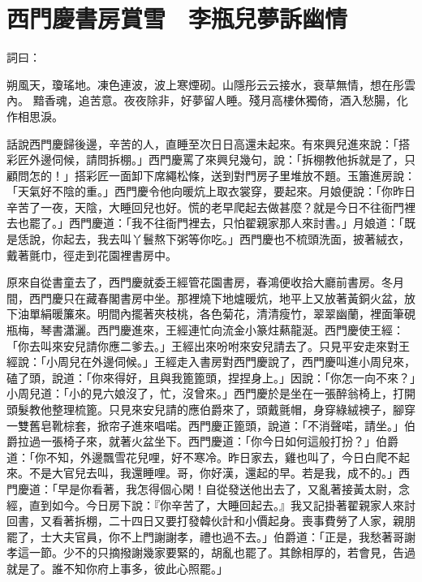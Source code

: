 %

\chapter{西門慶書房賞雪　李瓶兒夢訴幽情}

詞曰：

朔風天，瓊瑤地。凍色連波，波上寒煙砌。山隱彤云云接水，衰草無情，想在彤雲內。
黯香魂，追苦意。夜夜除非，好夢留人睡。殘月高樓休獨倚，酒入愁腸，化作相思淚。

話說西門慶歸後邊，辛苦的人，直睡至次日日高還未起來。有來興兒進來說：「搭彩匠外邊伺候，請問拆棚。」西門慶罵了來興兒幾句，說：「拆棚教他拆就是了，只顧問怎的！」搭彩匠一面卸下席繩松條，送到對門房子里堆放不題。玉簫進房說：「天氣好不陰的重。」西門慶令他向暖炕上取衣裳穿，要起來。月娘便說：「你昨日辛苦了一夜，天陰，大睡回兒也好。慌的老早爬起去做甚麼？就是今日不往衙門裡去也罷了。」西門慶道：「我不往衙門裡去，只怕翟親家那人來討書。」月娘道：「既是恁說，你起去，我去叫丫鬟熬下粥等你吃。」西門慶也不梳頭洗面，披著絨衣，戴著氈巾，徑走到花園裡書房中。

原來自從書童去了，西門慶就委王經管花園書房，春鴻便收拾大廳前書房。冬月間，西門慶只在藏春閣書房中坐。那裡燒下地爐暖炕，地平上又放著黃銅火盆，放下油單絹暖簾來。明間內擺著夾枝桃，各色菊花，清清瘦竹，翠翠幽蘭，裡面筆硯瓶梅，琴書瀟灑。西門慶進來，王經連忙向流金小篆炷爇龍涎。西門慶使王經：「你去叫來安兒請你應二爹去。」王經出來吩咐來安兒請去了。只見平安走來對王經說：「小周兒在外邊伺候。」王經走入書房對西門慶說了，西門慶叫進小周兒來，磕了頭，說道：「你來得好，且與我篦篦頭，捏捏身上。」因說：「你怎一向不來？」小周兒道：「小的見六娘沒了，忙，沒曾來。」西門慶於是坐在一張醉翁椅上，打開頭髮教他整理梳篦。只見來安兒請的應伯爵來了，頭戴氈帽，身穿綠絨襖子，腳穿一雙舊皂靴棕套，掀帘子進來唱喏。西門慶正篦頭，說道：「不消聲喏，請坐。」伯爵拉過一張椅子來，就著火盆坐下。西門慶道：「你今日如何這般打扮？」伯爵道：「你不知，外邊飄雪花兒哩，好不寒冷。昨日家去，雞也叫了，今日白爬不起來。不是大官兒去叫，我還睡哩。哥，你好漢，還起的早。若是我，成不的。」西門慶道：「早是你看著，我怎得個心閑！自從發送他出去了，又亂著接黃太尉，念經，直到如今。今日房下說：『你辛苦了，大睡回起去。』我又記掛著翟親家人來討回書，又看著拆棚，二十四日又要打發韓伙計和小價起身。喪事費勞了人家，親朋罷了，士大夫官員，你不上門謝謝孝，禮也過不去。」伯爵道：「正是，我愁著哥謝孝這一節。少不的只摘撥謝幾家要緊的，胡亂也罷了。其餘相厚的，若會見，告過就是了。誰不知你府上事多，彼此心照罷。」

